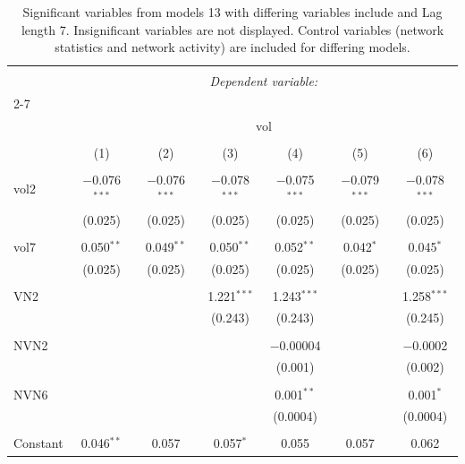 
\begin{table}[!htbp] \centering 
  \caption{Significant variables from models 13 with differing variables include 
                               and Lag length 7. Insignificant variables are not displayed. 
                               Control variables (network statistics and network activity) are 
                               included for differing models.} 
  \label{Volumemodels1_t} 
\scriptsize 
\begin{tabular}{@{\extracolsep{5pt}}lcccccc} 
\\[-1.8ex]\hline 
\hline \\[-1.8ex] 
 & \multicolumn{6}{c}{\textit{Dependent variable:}} \\ 
\cline{2-7} 
\\[-1.8ex] & \multicolumn{6}{c}{vol} \\ 
\\[-1.8ex] & (1) & (2) & (3) & (4) & (5) & (6)\\ 
\hline \\[-1.8ex] 
 vol2 & $-$0.076$^{***}$ & $-$0.076$^{***}$ & $-$0.078$^{***}$ & $-$0.075$^{***}$ & $-$0.079$^{***}$ & $-$0.078$^{***}$ \\ 
  & (0.025) & (0.025) & (0.025) & (0.025) & (0.025) & (0.025) \\ 
  & & & & & & \\ 
 vol7 & 0.050$^{**}$ & 0.049$^{**}$ & 0.050$^{**}$ & 0.052$^{**}$ & 0.042$^{*}$ & 0.045$^{*}$ \\ 
  & (0.025) & (0.025) & (0.025) & (0.025) & (0.025) & (0.025) \\ 
  & & & & & & \\ 
 VN2 &  &  & 1.221$^{***}$ & 1.243$^{***}$ &  & 1.258$^{***}$ \\ 
  &  &  & (0.243) & (0.243) &  & (0.245) \\ 
  & & & & & & \\ 
 NVN2 &  &  &  & $-$0.00004 &  & $-$0.0002 \\ 
  &  &  &  & (0.001) &  & (0.002) \\ 
  & & & & & & \\ 
 NVN6 &  &  &  & 0.001$^{**}$ &  & 0.001$^{*}$ \\ 
  &  &  &  & (0.0004) &  & (0.0004) \\ 
  & & & & & & \\ 
 Constant & 0.046$^{**}$ & 0.057 & 0.057$^{*}$ & 0.055 & 0.057 & 0.062 \\ 

\end{tabular}
\end{table}
